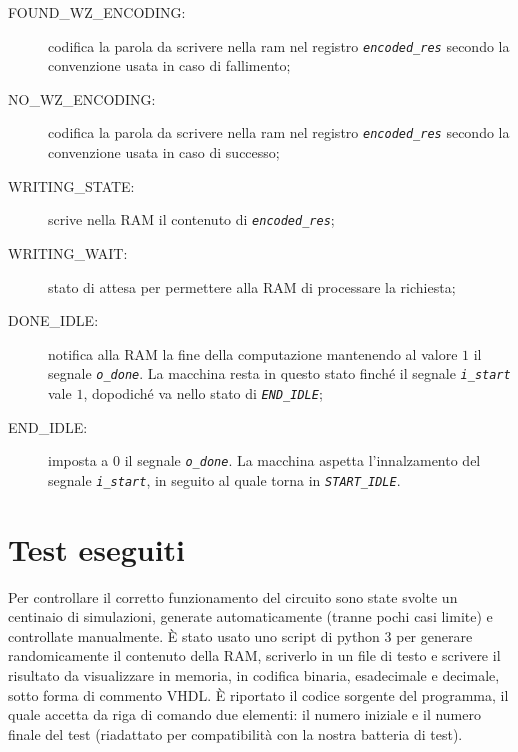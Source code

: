 \documentclass[12pt,a4paper,titlepage]{article}
\begin{document}
\begin{description}
		\item[FOUND\_WZ\_ENCODING:]	codifica la parola da scrivere nella ram nel registro \textit{\texttt{encoded\_res}} secondo 										la convenzione usata in caso di fallimento;
		\item[NO\_WZ\_ENCODING:]	codifica la parola da scrivere nella ram nel registro \textit{\texttt{encoded\_res}} secondo 										la convenzione usata in caso di successo;
		\item[WRITING\_STATE:]		scrive nella RAM il contenuto di \textit{\texttt{encoded\_res}};
		\item[WRITING\_WAIT:]		stato di attesa per permettere alla RAM di processare la richiesta;
		\item[DONE\_IDLE:]			notifica alla RAM la fine della computazione mantenendo al valore $1$ il segnale \textit{\texttt{o\_done}}. La macchina resta in questo stato finché il segnale \textit{\texttt{i\_start}} vale $1$, dopodiché va nello stato di \textit{\texttt{END\_IDLE}};
		\item[END\_IDLE:]			imposta a $0$ il segnale \textit{\texttt{o\_done}}. La macchina aspetta l'innalzamento del segnale \textit{\texttt{i\_start}}, in seguito al quale torna in \textit{\texttt{START\_IDLE}}.
		\end{description}
		
	\section{Test eseguiti} \label{sec:test}
       Per controllare il corretto funzionamento del circuito sono state svolte un centinaio di simulazioni, generate automaticamente (tranne pochi casi limite) e controllate manualmente. È stato usato uno script di python 3 per generare randomicamente il contenuto della RAM, scriverlo in un file di testo e scrivere il risultato da visualizzare in memoria, in codifica binaria, esadecimale e decimale, sotto forma di commento VHDL. È riportato il codice sorgente del programma, il quale accetta da riga di comando due elementi: il numero iniziale e il numero finale del test (riadattato per compatibilità con la nostra batteria di test).\newpage
       
\end{document}
